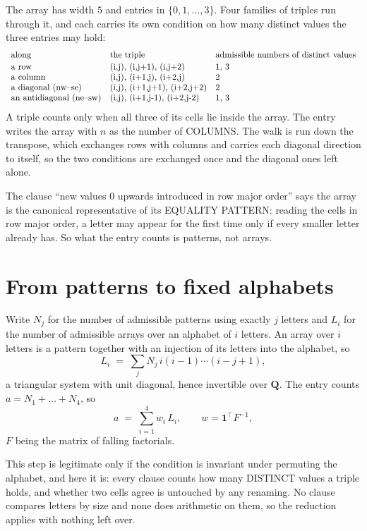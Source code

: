 \documentclass[11pt,a4paper]{article}
\theoremstyle{plain}
\theoremstyle{definition}
\begin{document}
The array has width $5$ and entries in $\{0,1,\dots,3\}$. Four families of triples
run through it, and each carries its own condition on how many distinct values the three
entries may hold:
\[
\begin{array}{lll}
\text{along} & \text{the triple} & \text{admissible numbers of distinct values} \\[2pt]
\text{a row} & $(i,j),\ (i,j+1),\ (i,j+2)$ & $1, 3$ \\
\text{a column} & $(i,j),\ (i+1,j),\ (i+2,j)$ & $2$ \\
\text{a diagonal (nw--se)} & $(i,j),\ (i+1,j+1),\ (i+2,j+2)$ & $2$ \\
\text{an antidiagonal (ne--sw)} & $(i,j),\ (i+1,j-1),\ (i+2,j-2)$ & $1, 3$ \\
\end{array}
\]
A triple counts only when all three of its cells lie inside the array. The entry writes the array with $n$ as the number of COLUMNS. The walk is run down the transpose, which exchanges rows with columns and carries each diagonal direction to itself, so the two conditions are exchanged once and the diagonal ones left alone.

The clause ``new values $0$ upwards introduced in row major order'' says the array is the
canonical representative of its EQUALITY PATTERN: reading the cells in row major order, a
letter may appear for the first time only if every smaller letter already has. So what the
entry counts is patterns, not arrays.

\section{From patterns to fixed alphabets}

Write $N_j$ for the number of admissible patterns using exactly $j$ letters and $L_i$ for the
number of admissible arrays over an alphabet of $i$ letters. An array over $i$ letters is a
pattern together with an injection of its letters into the alphabet, so
\[
L_i\;=\;\sum_j N_j\,i(i-1)\cdots(i-j+1),
\]
a triangular system with unit diagonal, hence invertible over $\mathbf{Q}$. The entry counts
$a=N_1+\dots+N_{4}$, so
\[
a\;=\;\sum_{i=1}^{4}w_i\,L_i ,\qquad w=\mathbf{1}^{\!\top}F^{-1},
\]
$F$ being the matrix of falling factorials.

This step is legitimate only if the condition is invariant under permuting the alphabet, and
here it is: every clause counts how many DISTINCT values a triple holds, and whether two cells
agree is untouched by any renaming. No clause compares letters by size and none does arithmetic
on them, so the reduction applies with nothing left over.
\end{document}
